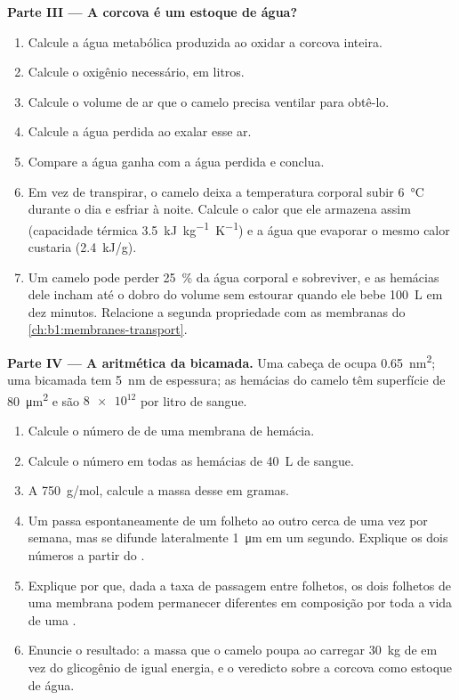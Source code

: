 \begin{problem}
\medskip
\noindent\textbf{Parte III --- A corcova é um estoque de água?}
\begin{enumerate}[resume]
  \item Calcule a água metabólica produzida ao oxidar a corcova
        inteira.
  \item Calcule o oxigênio necessário, em litros.
  \item Calcule o volume de ar que o camelo precisa ventilar para
        obtê-lo.
  \item Calcule a água perdida ao exalar esse ar.
  \item Compare a água ganha com a água perdida e conclua.
  \item Em vez de transpirar, o camelo deixa a temperatura corporal
        subir \qty{6}{\celsius} durante o dia e esfriar à noite. Calcule
        o calor que ele armazena assim (capacidade térmica
        \qty{3.5}{kJ.kg^{-1}.K^{-1}}) e a água que evaporar o mesmo
        calor custaria (\qty{2.4}{kJ/g}).
  \item Um camelo pode perder \qty{25}{\%} da água corporal e
        sobreviver, e as hemácias dele incham até o dobro do volume sem
        estourar quando ele bebe \qty{100}{L} em dez minutos. Relacione
        a segunda propriedade com as membranas do
        \cref{ch:b1:membranes-transport}.
\end{enumerate}

\medskip
\noindent\textbf{Parte IV --- A aritmética da bicamada.}
Uma cabeça de  ocupa \qty{0.65}{nm^2}; uma bicamada tem
\qty{5}{nm} de espessura; as hemácias do camelo têm superfície de
\qty{80}{\micro m^2} e são $\num{8e12}$ por litro de sangue.
\begin{enumerate}[resume]
  \item Calcule o número de  de uma membrana de hemácia.
  \item Calcule o número em todas as hemácias de \qty{40}{L} de sangue.
  \item A \qty{750}{g/mol}, calcule a massa desse  em gramas.
  \item Um  passa espontaneamente de um folheto ao outro
        cerca de uma vez por semana, mas se difunde lateralmente
        \qty{1}{\micro m} em um segundo. Explique os dois números a
        partir do .
  \item Explique por que, dada a taxa de passagem entre folhetos, os
        dois folhetos de uma membrana podem permanecer diferentes em
        composição por toda a vida de uma .
  \item Enuncie o resultado: a massa que o camelo poupa ao carregar
        \qty{30}{kg} de  em vez do glicogênio de igual energia, e
        o veredicto sobre a corcova como estoque de água.
\end{enumerate}
\end{problem}
